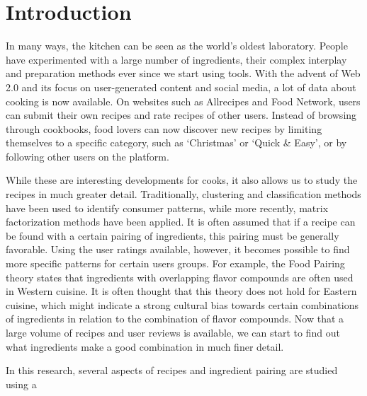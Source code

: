 \section{Introduction}
\label{sec:introduction}

In many ways, the kitchen can be seen as the world's oldest laboratory.
People have experimented with a large number of ingredients, their complex interplay and preparation methods ever since we start using tools.
With the advent of Web 2.0 and its focus on user-generated content and social media, a lot of data about cooking is now available.
On websites such as Allrecipes and Food Network, users can submit their own recipes and rate recipes of other users.
Instead of browsing through cookbooks, food lovers can now discover new recipes by limiting themselves to a specific category, such as `Christmas' or `Quick \& Easy', or by following other users on the platform.

While these are interesting developments for cooks, it also allows us to study the recipes in much greater detail.
Traditionally, clustering and classification methods have been used to identify consumer patterns, while more recently, matrix factorization methods have been applied.
It is often assumed that if a recipe can be found with a certain pairing of ingredients, this pairing must be generally favorable.
Using the user ratings available, however, it becomes possible to find more specific patterns for certain users groups.
For example, the Food Pairing theory states that ingredients with overlapping flavor compounds are often used in Western cuisine.
It is often thought that this theory does not hold for Eastern cuisine, which might indicate a strong cultural bias towards certain combinations of ingredients in relation to the combination of flavor compounds.
Now that a large volume of recipes and user reviews is available, we can start to find out what ingredients make a good combination in much finer detail.

In this research, several aspects of recipes and ingredient pairing are studied using a 